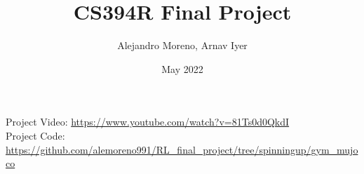 \documentclass{article}
\title{CS394R Final Project}
\author{Alejandro Moreno, Arnav  Iyer}
\date{May 2022}
\begin{document}
\maketitle

Project Video: \href{https://www.youtube.com/watch?v=81Ts0d0QkdI}{https://www.youtube.com/watch?v=81Ts0d0QkdI}\\
Project Code: \href{https://github.com/alemoreno991/RL_final_project/tree/spinningup/gym_mujoco}{https://github.com/alemoreno991/RL_final_project/tree/spinningup/gym_mujoco}








\printbibliography
\end{document}
